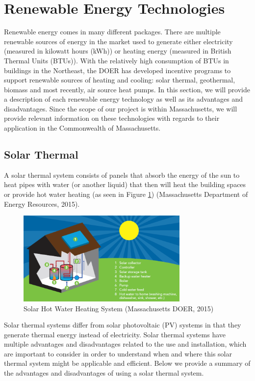   \section{Renewable Energy Technologies}
  \par Renewable energy comes in many different packages. There are multiple renewable sources of energy in the market used to generate either electricity (measured in kilowatt hours (kWh)) or heating energy (measured in British Thermal Units (BTUs)). With the relatively high consumption of BTUs in buildings in the Northeast, the DOER has developed incentive programs to support renewable sources of heating and cooling: solar thermal, geothermal, biomass and most recently, air source heat pumps. In this section, we will provide a description of each renewable energy technology as well as its advantages and disadvantages. Since the scope of our project is within Massachusetts, we will provide relevant information on these technologies with regards to their application in the Commonwealth of Massachusetts. 

    \subsection{Solar Thermal}
    \par A solar thermal system consists of panels that absorb the energy of the sun to heat pipes with water (or another liquid) that then will heat the building spaces or provide hot water heating (as seen in Figure \ref{fig:solar}) (Massachusetts Department of Energy Resources, 2015).
    \begin{figure}[h]
      \centering
        \includegraphics[width=0.75\textwidth]{images/03-SolarHotWaterHeatingSystem}
      \caption{Solar Hot Water Heating System (Massachusetts DOER, 2015)}
      \label{fig:solar}
    \end{figure}
    \par Solar thermal systems differ from solar photovoltaic (PV) systems in that they generate thermal energy instead of electricity. Solar thermal systems have multiple advantages and disadvantages related to the use and installation, which are important to consider in order to understand when and where this solar thermal system might be applicable and efficient. Below we provide a summary of the advantages and disadvantages of using a solar thermal system.\\

